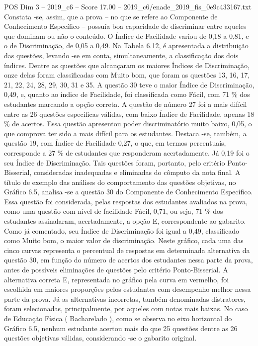 \begin{textsample}{POS Dim 3 – 2019\_c6 – Score 17.00 – 2019\_c6/enade\_2019\_fis\_0e9c433167.txt}
Constata -se, assim, que a prova – no que se refere ao Componente de Conhecimento Específico – possuía boa capacidade de discriminar entre aqueles que dominam ou não o conteúdo.
O Índice de Facilidade variou de 0,18 a 0,81, e o de Discriminação, de 0,05 a 0,49.
Na Tabela 6.12, é apresentada a distribuição das questões, levando -se em conta, simultaneamente, a classificação dos dois índices.
Dentre as questões que alcançaram os maiores Índices de Discriminação, onze delas foram classificadas com Muito bom, que foram as questões 13, 16, 17, 21, 22, 24, 28, 29, 30, 31 e 35.
A questão 30 teve o maior Índice de Discriminação, 0,49, e, quanto ao índice de Facilidade, foi classificada como Fácil, com 71 \% dos estudantes marcando a opção correta.
A questão de número 27 foi a mais difícil entre as 26 questões específicas válidas, com baixo Índice de Facilidade, apenas 18 \% de acertos.
Essa questão apresentou poder discriminatório muito baixo, 0,05, o que comprova ter sido a mais difícil para os estudantes.
Destaca -se, também, a questão 19, com Índice de Facilidade 0,27, o que, em termos percentuais, corresponde a 27 \% de estudantes que responderam acertadamente.
Já 0,19 foi o seu Índice de Discriminação.
Tais questões foram, portanto, pelo critério Ponto-Bisserial, consideradas inadequadas e eliminadas do cômputo da nota final.
A título de exemplo das análises do comportamento das questões objetivas, no Gráfico 6.5, analisa -se a questão 30 do Componente de Conhecimento Específico.
Essa questão foi considerada, pelas respostas dos estudantes avaliados na prova, como uma questão com nível de facilidade Fácil, 0,71, ou seja, 71 \% dos estudantes assinalaram, acertadamente, a opção E, correspondente ao gabarito.
Como já comentado, seu Índice de Discriminação foi igual a 0,49, classificado como Muito bom, o maior valor de discriminação.
Neste gráfico, cada uma das cinco curvas representa o percentual de respostas em determinada alternativa da questão 30, em função do número de acertos dos estudantes nessa parte da prova, antes de possíveis eliminações de questões pelo critério Ponto-Bisserial.
A alternativa correta E, representada no gráfico pela curva em vermelho, foi escolhida em maiores proporções pelos estudantes com desempenho melhor nessa parte da prova.
Já as alternativas incorretas, também denominadas distratores, foram selecionadas, principalmente, por aqueles com notas mais baixas.
No caso de Educação Física ( Bacharelado ), como se observa no eixo horizontal do Gráfico 6.5, nenhum estudante acertou mais do que 25 questões dentre as 26 questões objetivas válidas, considerando -se o gabarito original.

\end{textsample}
